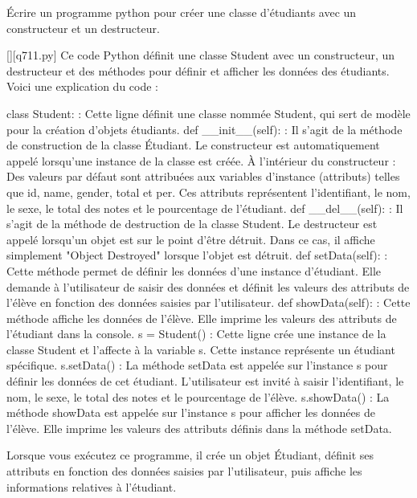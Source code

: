         \question
        Écrire un programme python pour créer une classe d'étudiants avec un constructeur et un destructeur.
        \par
        \begin{solution}
            \renewcommand{\nomfichier}{q711.py}
            \pythonfile{\chemincode \nomfichier}[][\nomfichier]
            Ce code Python définit une classe Student avec un constructeur, un destructeur et des méthodes pour définir et afficher les données des étudiants. Voici une explication du code :

    class Student: : Cette ligne définit une classe nommée Student, qui sert de modèle pour la création d'objets étudiants.
    def \_\_init\_\_(self): : Il s'agit de la méthode de construction de la classe Étudiant. Le constructeur est automatiquement appelé lorsqu'une instance de la classe est créée. À l'intérieur du constructeur :
        Des valeurs par défaut sont attribuées aux variables d'instance (attributs) telles que id, name, gender, total et per.
        Ces attributs représentent l'identifiant, le nom, le sexe, le total des notes et le pourcentage de l'étudiant.
    def \_\_del\_\_(self): : Il s'agit de la méthode de destruction de la classe Student. Le destructeur est appelé lorsqu'un objet est sur le point d'être détruit. Dans ce cas, il affiche simplement "Object Destroyed" lorsque l'objet est détruit.
    def setData(self): : Cette méthode permet de définir les données d'une instance d'étudiant. Elle demande à l'utilisateur de saisir des données et définit les valeurs des attributs de l'élève en fonction des données saisies par l'utilisateur.
    def showData(self): : Cette méthode affiche les données de l'élève. Elle imprime les valeurs des attributs de l'étudiant dans la console.
    s = Student() : Cette ligne crée une instance de la classe Student et l'affecte à la variable s. Cette instance représente un étudiant spécifique.
    s.setData() : La méthode setData est appelée sur l'instance s pour définir les données de cet étudiant. L'utilisateur est invité à saisir l'identifiant, le nom, le sexe, le total des notes et le pourcentage de l'élève.
    s.showData() : La méthode showData est appelée sur l'instance s pour afficher les données de l'élève. Elle imprime les valeurs des attributs définis dans la méthode setData.

Lorsque vous exécutez ce programme, il crée un objet Étudiant, définit ses attributs en fonction des données saisies par l'utilisateur, puis affiche les informations relatives à l'étudiant.
        \end{solution}
        

